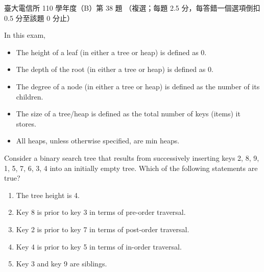 \begin{pastexam}[label={px:ntu-110-comm-dsa-38}]{臺大電信所 110 學年度（B）第 38 題}
（複選；每題 2.5 分，每答錯一個選項倒扣 0.5 分至該題 0 分止）

In this exam,
\begin{itemize}
\item The height of a leaf (in either a tree or heap) is defined as 0.
\item The depth of the root (in either a tree or heap) is defined as 0.
\item The degree of a node (in either a tree or heap) is defined as the number of its children.
\item The size of a tree/heap is defined as the total number of keys (items) it stores.
\item All heaps, unless otherwise specified, are min heaps.
\end{itemize}

Consider a binary search tree that results from successively inserting keys 2, 8, 9, 1, 5, 7, 6, 3, 4 into an initially empty tree. Which of the following statements are true?
\begin{enumerate}[label=\Alph*.]
\item The tree height is 4.
\item Key 8 is prior to key 3 in terms of pre-order traversal.
\item Key 2 is prior to key 7 in terms of post-order traversal.
\item Key 4 is prior to key 5 in terms of in-order traversal.
\item Key 3 and key 9 are siblings.
\end{enumerate}
\end{pastexam}

